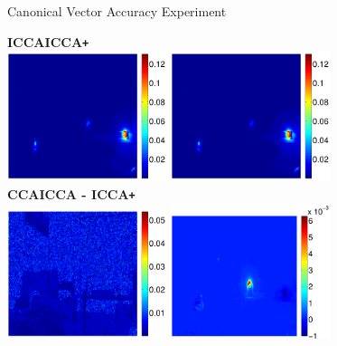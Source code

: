 \documentclass[8pt]{beamer}
\newcommand{\iccap}{ICCA\texttt{+} }
\begin{document}
\begin{frame}{Canonical Vector Accuracy Experiment}
  \begin{center}
    \textbf{ICCA}\hspace{23ex}\textbf{\iccap}\phantom{blah}\\
    \includegraphics[width=0.35\textwidth]{figures/flashing1_left1_icca.pdf}\hspace{2ex}
    \includegraphics[width=0.35\textwidth]{figures/flashing1_left1_opt.pdf}\\[2ex]
    \textbf{CCA}\hspace{23ex}\textbf{ICCA - \iccap}\\
    \includegraphics[width=0.35\textwidth]{figures/flashing1_left1_cca.pdf}\hspace{2ex}
    \includegraphics[width=0.35\textwidth]{figures/flashing1_left1_diff_icca.pdf}
  \end{center}
\end{frame}
\end{document}
